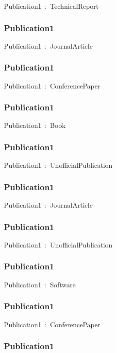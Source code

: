 \documentclass{article}
\begin{document}
Publication1~:~TechnicalReport

\subsubsection*{Publication1}

Publication1~:~JournalArticle

\subsubsection*{Publication1}

Publication1~:~ConferencePaper

\subsubsection*{Publication1}

Publication1~:~Book

\subsubsection*{Publication1}

Publication1~:~UnofficialPublication

\subsubsection*{Publication1}

Publication1~:~JournalArticle

\subsubsection*{Publication1}

Publication1~:~UnofficialPublication

\subsubsection*{Publication1}

Publication1~:~Software

\subsubsection*{Publication1}

Publication1~:~ConferencePaper

\subsubsection*{Publication1}
\end{document}
